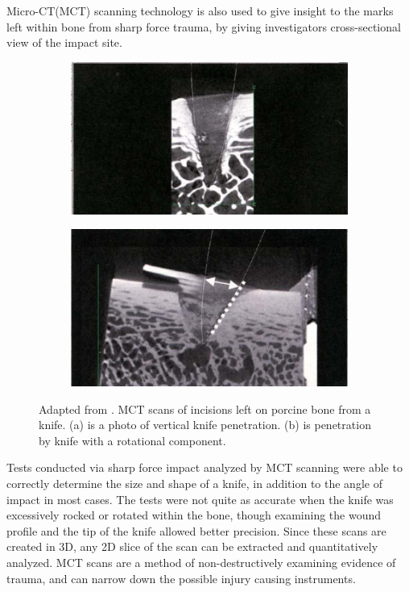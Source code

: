 \documentclass[titlepage]{article}
\begin{document}
Micro-CT(MCT) scanning technology is also used to give insight to the marks left within bone from sharp force trauma, by giving investigators cross-sectional view of the impact site.

\begin{figure}[h!]
\centering
\begin{subfigure}{.5\textwidth}
  \centering
  \includegraphics[width=.7\linewidth]{sharp_vertical}
  \caption{}
  \end{subfigure}%
\begin{subfigure}{.5\textwidth}
  \centering
  \includegraphics[width=.7\linewidth]{sharp_rotational}
  \caption{}
\end{subfigure}
\caption{Adapted from \cite{micro-ct}. MCT scans of incisions left on porcine bone from a knife. (a) is a photo of vertical knife penetration. (b) is penetration by knife with a rotational component.}
\label{fig:mct_scan}
\end{figure}

Tests conducted via sharp force impact analyzed by MCT scanning were able to correctly determine the size and shape of a knife, in addition to the angle of impact in most cases. The tests were not quite as accurate when the knife was excessively rocked or rotated within the bone, though examining the wound profile and the tip of the knife allowed better precision.\cite{micro-ct} Since these scans are created in 3D, any 2D slice of the scan can be extracted and quantitatively analyzed. MCT scans are a method of non-destructively examining evidence of trauma, and can narrow down the possible injury causing instruments.
\end{document}
